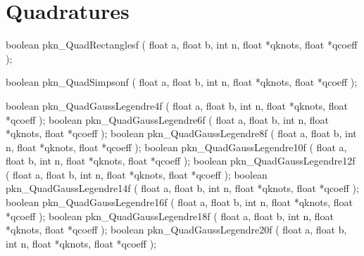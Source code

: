 \newpage
\section{Quadratures}

\begin{listingC}
boolean pkn_QuadRectanglesf ( float a, float b, int n,
                              float *qknots, float *qcoeff );
\end{listingC}

\begin{listingC}
boolean pkn_QuadSimpsonf ( float a, float b, int n,
                           float *qknots, float *qcoeff );
\end{listingC}


\begin{listingC}
boolean pkn_QuadGaussLegendre4f ( float a, float b, int n,
                                  float *qknots, float *qcoeff );
boolean pkn_QuadGaussLegendre6f ( float a, float b, int n,
                                  float *qknots, float *qcoeff );
boolean pkn_QuadGaussLegendre8f ( float a, float b, int n,
                                  float *qknots, float *qcoeff );
boolean pkn_QuadGaussLegendre10f ( float a, float b, int n,
                                   float *qknots, float *qcoeff );
boolean pkn_QuadGaussLegendre12f ( float a, float b, int n,
                                   float *qknots, float *qcoeff );
boolean pkn_QuadGaussLegendre14f ( float a, float b, int n,
                                   float *qknots, float *qcoeff );
boolean pkn_QuadGaussLegendre16f ( float a, float b, int n,
                                   float *qknots, float *qcoeff );
boolean pkn_QuadGaussLegendre18f ( float a, float b, int n,
                                   float *qknots, float *qcoeff );
boolean pkn_QuadGaussLegendre20f ( float a, float b, int n,
                                   float *qknots, float *qcoeff );
\end{listingC}


